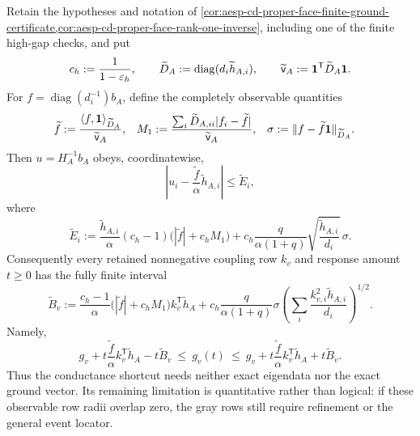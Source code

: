 \begin{corollary}
\label{cor:aesp-cd-proper-face-finite-rank-one-inverse}
Retain the hypotheses and notation of
\cref{cor:aesp-cd-proper-face-finite-ground-certificate,cor:aesp-cd-proper-face-rank-one-inverse},
including one of the finite
high-gap checks, and put
\begin{equation*}
 c_h:=\frac{1}{1-\varepsilon_h},
 \qquad
 \widetilde D_A:=\operatorname{diag}(d_i\widetilde h_{A,i}),
 \qquad
 \widetilde{\mathsf v}_A:=\mathbf{1}^{\mathsf T}\widetilde D_A\mathbf{1}.
\end{equation*}
For \(f=\operatorname{diag}(d_i^{-1})b_A\), define the completely observable
quantities
\begin{align*}
 \widetilde f
 &:=\frac{\langle f,\mathbf{1}\rangle_{\widetilde D_A}}
           {\widetilde{\mathsf v}_A},&
 M_1
 &:=\frac{\sum_i\widetilde D_{A,ii}|f_i-\widetilde f|}
              {\widetilde{\mathsf v}_A},&
 \sigma
 &:=\lVert f-\widetilde f\mathbf{1}\rVert_{\widetilde D_A}.
\end{align*}
Then \(u=H_A^{-1}b_A\) obeys, coordinatewise,
\begin{equation}
 \left|u_i-\frac{\widetilde f}{\alpha}\widetilde h_{A,i}\right|
 \leq \widetilde E_i,
 \label{eq:aesp-cd-proper-face-finite-rank-one-coordinate}
\end{equation}
where
\begin{equation}
 \widetilde E_i:=
 \frac{\widetilde h_{A,i}}{\alpha}(c_h-1)
       \bigl(|\widetilde f|+c_hM_1\bigr)
 +c_h\frac{q}{\alpha(1+q)}
       \sqrt{\frac{\widetilde h_{A,i}}{d_i}}\,\sigma .
 \label{eq:aesp-cd-proper-face-finite-rank-one-radius}
\end{equation}
Consequently every retained nonnegative coupling row \(k_v\) and response
amount \(t\geq0\) has the fully finite interval
\begin{equation*}
 \widetilde B_v:=
 \frac{c_h-1}{\alpha}
 \bigl(|\widetilde f|+c_hM_1\bigr)
 k_v^{\mathsf T}\widetilde h_A
 +c_h\frac{q}{\alpha(1+q)}\sigma
 \left(\sum_i\frac{k_{v,i}^2\widetilde h_{A,i}}{d_i}\right)^{1/2}.
\end{equation*}
Namely,
\begin{equation}
 g_v+t\frac{\widetilde f}{\alpha}
              k_v^{\mathsf T}\widetilde h_A
       -t\widetilde B_v
 \ \leq\ g_v(t)\ \leq\
 g_v+t\frac{\widetilde f}{\alpha}
              k_v^{\mathsf T}\widetilde h_A
       +t\widetilde B_v .
 \label{eq:aesp-cd-proper-face-finite-rank-one-row}
\end{equation}
Thus the conductance shortcut needs neither exact eigendata nor the exact
ground vector.  Its remaining limitation is quantitative rather than
logical: if these observable row radii overlap zero, the gray rows still
require refinement or the general event locator.
\end{corollary}

